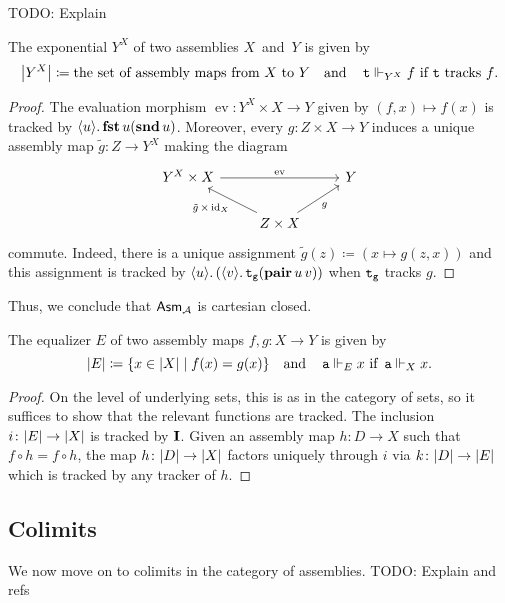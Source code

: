\textcolor{Mulberry}{TODO: Explain}
\begin{proposition}[Exponentials]
  The exponential \(Y^X\) of two assemblies \(X\)~and~\(Y\) is given by
  \[
    \carrier*{Y^X} \coloneq
    \text{the set of assembly maps from \(X\) to \(Y\)}
    \quad\text{and}\quad
    \pca{t} \realizes_{Y^X} f
    \text{ if \(\pca{t}\) tracks \(f\)}.
  \]
\end{proposition}
\begin{proof}
  The evaluation morphism \(\operatorname{ev} \colon Y^X \times X \to Y\) given
  by \((f,x) \mapsto f(x)\) is tracked by
  \(\lambdapca{u}{\pcafst u(\pcasnd u)}\).
  Moreover, every \(g \colon Z \times X \to Y\) induces a unique assembly map
  \(\tilde g \colon Z \to Y^X\) making the diagram
  \[
    \begin{tikzcd}
      Y^X \times X \ar[rr,"\operatorname{ev}"]
      & & Y \\
      & Z \times X \ar[ur,"g"']
      \ar[ul,"{\tilde g} \,\times\, {\id_X}"]
    \end{tikzcd}
  \]
  commute.
  Indeed, there is a unique assignment
  \(\tilde g(z) \coloneq (x \mapsto g(z,x))\) and this assignment is tracked by
  \(\lambdapca{u}{(\lambdapca{v}{\pca{t_g}(\pcapair u\,v)})}\) when
  \(\pca{t_g}\) tracks \(g\).
\end{proof}

Thus, we conclude that \(\Asm{\AA}\) is cartesian closed.

\begin{proposition}[Equalizers]
  The equalizer \(E\) of two assembly maps \(f,g \colon X \to Y\) is given by
  \[
    \carrier{E} \coloneq \set{x \in \carrier{X} \mid f(x) = g(x)}
    \quad\text{and}\quad
    \pca{a} \realizes_E x \text{ if } \pca{a} \realizes_X x.
  \]
\end{proposition}
\begin{proof}
  On the level of underlying sets, this is as in the category of sets, so it
  suffices to show that the relevant functions are tracked.
  The inclusion \(i \colon \carrier{E} \to \carrier{X}\) is tracked by
  \(\icomb\).
  Given an assembly map \(h \colon D \to X\) such that
  \(f \circ h = f \circ h\), the map \(h \colon \carrier{D} \to \carrier{X}\)
  factors uniquely through \(i\) via \(k \colon \carrier{D} \to \carrier{E}\)
  which is tracked by any tracker of \(h\).
\end{proof}

\subsection{Colimits}
%
We now move on to colimits in the category of assemblies.
\textcolor{Mulberry}{TODO: Explain and refs}

